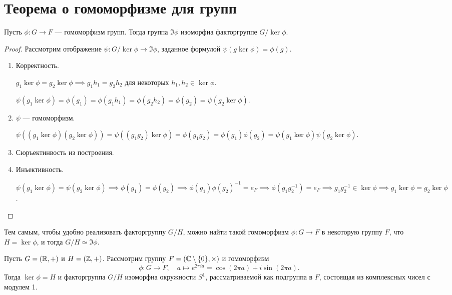\section{Теорема о гомоморфизме для групп}

\begin{theorem}
    Пусть $\phi \colon G \to F$ --- гомоморфизм групп. Тогда группа $\Im \phi$ изоморфна факторгруппе $G / \ker \phi$.
\end{theorem}

\begin{proof}
    Рассмотрим отображение $\psi \colon G / \ker \phi \to \Im \phi$, заданное формулой $\psi(g \ker \phi) = \phi(g)$.

    \begin{enumerate}
    \item Корректность.

        $g_1 \ker \phi = g_2 \ker \phi \implies g_1 h_1 = g_2 h_2$ для некоторых $h_1, h_2 \in \ker \phi$.

        $\psi(g_1 \ker \phi) = \phi(g_1) = \phi(g_1 h_1) = \phi(g_2 h_2) = \phi(g_2) = \psi(g_2 \ker \phi)$.

    \item $\psi$ --- гомоморфизм.

        $\psi\left((g_1 \ker \phi)(g_2 \ker \phi)\right) = \psi((g_1 g_2) \ker \phi) = \phi(g_1 g_2) = \phi(g_1) \phi(g_2) = \psi(g_1 \ker \phi) \psi(g_2 \ker \phi)$.

    \item Сюръектинвость из построения.

    \item Инъективность.

        $\psi(g_1 \ker \phi) = \psi(g_2 \ker \phi) \implies \phi(g_1) = \phi(g_2) \implies \phi(g_1)\phi(g_2)^{-1} = e_F \implies \phi(g_1 g_2^{-1}) = e_F \implies g_1 g_2^{-1} \in \ker \phi \implies g_1 \ker \phi = g_2 \ker \phi$.
        \qedhere
    \end{enumerate}
\end{proof}

Тем самым, чтобы удобно реализовать факторгруппу $G / H$, можно найти такой гомоморфизм $\phi \colon G \to F$ в некоторую группу $F$, что $H = \ker \phi$, и тогда $G / H \simeq \Im \phi$.

\begin{example}
    Пусть $G = (\mathbb{R}, +)$ и $H = (\mathbb{Z}, +)$. Рассмотрим группу $F = (\mathbb{C} \setminus \{0\}, \times)$ и гомоморфизм
    \begin{equation*}
        \phi \colon G \to F, \quad a \mapsto e^{2 \pi i a} = \cos(2 \pi a) + i \sin (2 \pi a)
    .\end{equation*}
    Тогда $\ker \phi = H$ и факторгруппа $G / H$ изоморфна окружности $S^{1}$, рассматриваемой как подгруппа в $F$, состоящая из комплексных чисел с модулем 1.
\end{example}
